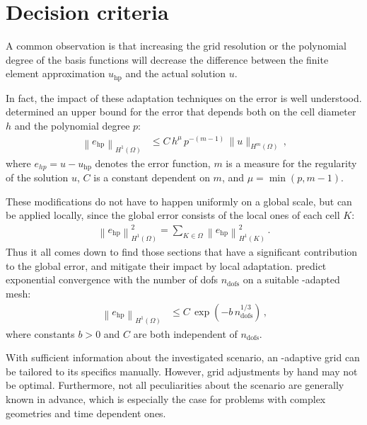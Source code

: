 \section{Decision criteria}
\label{sec:decision}

A common observation is that increasing the grid resolution or the polynomial degree of the basis functions will decrease the difference between the finite element approximation $u_\text{hp}$ and the actual solution $u$.

In fact, the impact of these adaptation techniques on the error is well understood. \textcite[Thm.~3.4]{babuska1990} determined an upper bound for the error that depends both on the cell diameter $h$ and the polynomial degree $p$:
\begin{align}
\label{eq:errorbound_hp} \left\|e_\text{hp}\right\|_{H^{1}(\Omega)} &\leq C \, h^{\mu} \, p^{-(m-1)} \, \|u\|_{H^{m}(\Omega)} \,\text{,}
\end{align}
where $e_{hp} = u - u_\text{hp}$ denotes the error function, $m$ is a measure for the regularity of the solution $u$, $C$ is a constant dependent on $m$, and $\mu = \min \left(p, m - 1\right)$.

These modifications do not have to happen uniformly on a global scale, but can be applied locally, since the global error consists of the local ones of each cell $K$:
\begin{align}
\label{eq:error_sum} \left\|e_\text{hp}\right\|_{H^1(\Omega)}^2 = \sum\limits_{K \in \Omega} \left\|e_\text{hp}\right\|_{H^1(K)}^2 \,\text{.}
\end{align}
Thus it all comes down to find those sections that have a significant contribution to the global error, and mitigate their impact by local adaptation. \textcite[Thm.~5.1]{guo1986} predict exponential convergence with the number of \glspl{dof} $n_\text{dofs}$ on a suitable \hp-adapted mesh:
\begin{align}
\label{eq:errorbound_exp} \left\|e_\text{hp}\right\|_{H^{1}(\Omega)} &\leq C \, \exp\left(- b \, n_\text{dofs}^{1 / 3}\right) \,\text{,}
\end{align}
where constants $b > 0$ and $C$ are both independent of $n_\text{dofs}$.

With sufficient information about the investigated scenario, an \hp-adaptive grid can be tailored to its specifics manually. However, grid adjustments by hand may not be optimal. Furthermore, not all peculiarities about the scenario are generally known in advance, which is especially the case for problems with complex geometries and time dependent ones.

